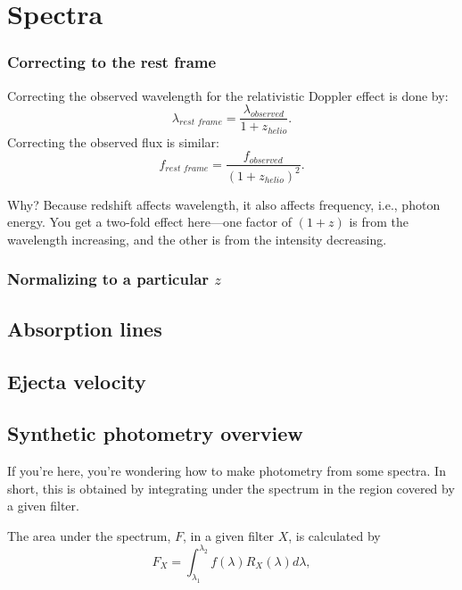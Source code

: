 \section{Spectra}
\subsubsection{Correcting to the rest frame}
\label{sec:spec_restframe}
Correcting the observed wavelength for the relativistic Doppler effect is done by: 
\begin{equation}
    \lambda_{rest \,\, frame} = \frac{\lambda_{observed}}{1+z_{helio}}.
\end{equation}
Correcting the observed flux is similar: 
\begin{equation}
    f_{rest \,\, frame} = \frac{f_{observed}}{(1+z_{helio})^{2}}.
\end{equation}

Why? Because redshift affects wavelength, it also affects frequency, i.e., photon energy. You get a two-fold effect here---one factor of $(1+ z)$ is from the wavelength increasing, and the other is from the intensity decreasing. 

\subsubsection{Normalizing to a particular $z$}
\subsection{Absorption lines}
\subsection{Ejecta velocity}
\subsection{Synthetic photometry overview}

If you're here, you're wondering how to make photometry from some spectra. In short, this is obtained by integrating under the spectrum in the region covered by a given filter. 

The area under the spectrum, $F$, in a given filter $X$, is calculated by
\begin{equation}
    F_{X} = \int_{\lambda_{1}}^{\lambda_{2}} f(\lambda) R_{X}(\lambda) d\lambda,
\label{eqn:synthint}
\end{equation}


